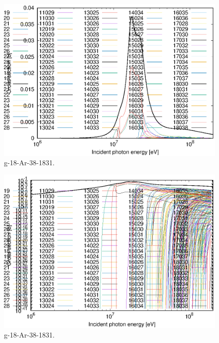 \begin{figure}
 \includegraphics[width=\linewidth]{eps/g_18-Ar-38_1831.eps}
  \caption{g-18-Ar-38-1831.}
\end{figure}
\begin{figure}
 \includegraphics[width=\linewidth]{eps-log/g_18-Ar-38_1831.eps}
 \caption{g-18-Ar-38-1831.}
\end{figure}
\newpage \clearpage


